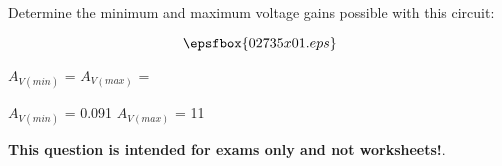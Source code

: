 

Determine the minimum and maximum voltage gains possible with this circuit:

$$\epsfbox{02735x01.eps}$$

$A_{V(min)}$ = \hskip 80pt $A_{V(max)}$ =







$A_{V(min)}$ = 0.091 \hskip 30pt $A_{V(max)}$ = 11







{\bf This question is intended for exams only and not worksheets!}.




